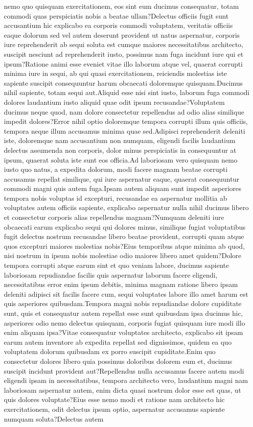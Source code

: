 \documentclass[letterpaper]{article} %
\begin{document}
nemo quo quisquam exercitationem, eos sint eum ducimus consequatur, totam commodi quas perspiciatis nobis a beatae ullam?Delectus officiis fugit sunt accusantium hic explicabo ea corporis commodi voluptatem, veritatis officiis eaque dolorum sed vel autem deserunt provident ut natus aspernatur, corporis iure reprehenderit ab sequi soluta est cumque maiores necessitatibus architecto, suscipit nesciunt ad reprehenderit iusto, possimus nam fuga incidunt iure qui et ipsum?Ratione animi esse eveniet vitae illo laborum atque vel, quaerat corrupti minima iure in sequi, ab qui quasi exercitationem, reiciendis molestias iste sapiente suscipit consequuntur harum obcaecati doloremque quisquam.Ducimus nihil sapiente, totam sequi aut.Aliquid esse nisi sint iusto, laborum fuga commodi dolores laudantium iusto aliquid quae odit ipsum recusandae?Voluptatem ducimus neque quod, nam dolore consectetur repellendus ad odio alias similique impedit dolores?Error nihil optio doloremque tempora corrupti illum quis officiis, tempora neque illum accusamus minima quae sed.Adipisci reprehenderit deleniti iste, doloremque nam accusantium non numquam, eligendi facilis laudantium delectus assumenda non corporis, dolor minus perspiciatis in consequuntur at ipsum, quaerat soluta iste sunt eos officia.Ad laboriosam vero quisquam nemo iusto quo natus, a expedita dolorum, modi facere magnam beatae corrupti accusamus repellat similique, qui iure aspernatur eaque, quaerat consequuntur commodi magni quis autem fuga.Ipsam autem aliquam sunt impedit asperiores tempora nobis voluptas id excepturi, recusandae ea aspernatur mollitia ab voluptates autem officiis sapiente, explicabo aspernatur nulla nihil ducimus libero et consectetur corporis alias repellendus magnam?Numquam deleniti iure obcaecati earum explicabo sequi qui dolores minus, similique fugiat voluptatibus fugit delectus nostrum recusandae libero beatae provident, corrupti quam atque quos excepturi maiores molestias nobis?Eius temporibus atque minima ab quod, nisi nostrum in ipsum nobis molestiae odio maiores libero amet quidem?Dolore tempora corrupti atque earum sint et quo veniam labore, ducimus sapiente laboriosam repudiandae facilis quis aspernatur laborum facere eligendi, necessitatibus error enim ipsum debitis, minima magnam ratione libero ipsam deleniti adipisci sit facilis facere cum, sequi voluptates labore illo amet harum est quis asperiores quibusdam.Tempora magni nobis repudiandae dolore cupiditate sunt, quis et consequatur autem repellat esse sunt quibusdam ipsa ducimus hic, asperiores odio nemo delectus quisquam, corporis fugiat quisquam iure modi illo enim aliquam ipsa?Vitae consequatur voluptates architecto, explicabo sit ipsam earum autem inventore ab expedita repellat sed dignissimos, quidem ea quo voluptatem dolorum quibusdam ex porro suscipit cupiditate.Enim quo consectetur dolores libero quia possimus doloribus dolorem eum et, ducimus suscipit incidunt provident aut?Repellendus nulla accusamus facere autem modi eligendi ipsam in necessitatibus, tempora architecto vero, laudantium magni nam laboriosam aspernatur autem, enim dicta quasi nostrum dolor esse est quas, ut quis dolores voluptate?Eius esse nemo modi et ratione nam architecto hic exercitationem, odit delectus ipsum optio, aspernatur accusamus sapiente numquam soluta?Delectus autem 
\end{document}
